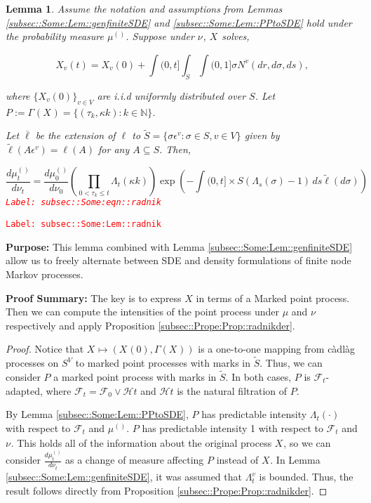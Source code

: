 \documentclass[12pt]{article}
\newcommand{\mb}{\mathbb}
\newcommand{\mc}{\mathcal}
\newcommand{\ov}{\overline}
\newcommand{\ep}{\epsilon}
\newcommand{\tr}{\textcolor{red}}
\newcommand{\labe}[1]{\tr{\texttt{Label: #1}}}
\newcommand{\purpose}{\textbf{Purpose: }}
\newcommand{\pfsum}{\textbf{Proof Summary: }}
\newcommand{\ind}{\hspace{24pt}}
\newcommand{\defeq}{:=}								%
\renewcommand{\v}{v}							%
\renewcommand{\S}{S}							%
\newcommand{\s}{\sigma}							%
\newcommand{\ev}{\ep}							%
\renewcommand{\t}{t}							%
\renewcommand{\tt}{s}							%
\newcommand{\F}{\mc{F}}							%
\newcommand{\FH}{\mc{H}}						%
\newcommand{\X}{X}								%
\newcommand{\vind}[1]{^{#1}}					%
\newcommand{\carp}[1]{^{#1}}					%
\newcommand{\vsi}[1]{^{#1}}						%
\newcommand{\cind}[1]{_{#1}}					%
\newcommand{\tp}[1]{(#1)}						%
\newcommand{\tip}[1]{#1}						%
\newcommand{\ts}[1]{_{#1}}						%
\newcommand{\sln}[1]{^{(#1)}}					%
\newcommand{\poiss}{N}							%
\newcommand{\Sm}{\ell}							%
\renewcommand{\r}{r}							%
\newcommand{\alt}[1]{\widetilde{#1}}			%
\newcommand{\indx}[1]{_{#1}}					%
\newcommand{\m}{\mu}							%
\newcommand{\mm}{\nu}							%
\newcommand{\rt}{\tau}							%
\renewcommand{\it}{k}							%
\newcommand{\pmap}{\Gamma}						%
\renewcommand{\mark}{\kappa}					%
\newcommand{\rp}{P}								%
\newcommand{\typset}{A}							%
\newcommand{\ratee}{\Lambda}					%
\newtheorem{lem}[thms]{Lemma}
\begin{document}
\begin{lem}
Assume the notation and assumptions from Lemmas \ref{subsec::Some:Lem::genfiniteSDE} and \ref{subsec::Some:Lem::PPtoSDE} hold under the probability measure \(\m\sln{}\ts{}\). Suppose under \(\mm\vind{}\ts{}\), \(\X\cind{}\tip{}\) solves,

\[\X\cind{\v}\tp{\t} = \X\cind{\v}\tp{0} +\int{(0,\t]}\int_\S\int{(0,1]} \s \poiss\vind{\v}(d\r,d\s,d\tt),\]

where \(\{\X\cind{\v}\tp{0}\}_{\v \in V}\) are i.i.d uniformly distributed over \(\S\). Let \(\rp{} \defeq \pmap\vind{}(\X\cind{}\tip{}) = \{(\rt\indx{\it},\mark{\it}):\it\in \mb{N}\}\).

\ind Let \(\ov{\ell}\) be the extension of \(\Sm\) to \(\alt{\S} = \{\s\ev\vind{\v}: \s \in \S, \v \in V\}\) given by \(\alt{\Sm}(\typset\ev\vind{\v}) = \Sm(\typset)\) for any \(\typset \subseteq \S\). Then,

\begin{equation}
\frac{d\m\sln{}\ts{\t}}{d\mm\vind{}\ts{\t}}= \frac{d\m\sln{}\ts{0}}{d\mm\vind{}\ts{0}}\left(\prod_{0< \rt\indx{\it}\leq \t} \ratee\ts{\t}(\mark{\it})\right)\exp\left(-\int{(0,\t]\times \S} (\ratee\ts{\tt}(\s) - 1)\,d\tt\alt{\Sm}(d\s)\right)
\label{subsec::Some:eqn::radnik}
\end{equation}
\labe{subsec::Some:eqn::radnik}
\label{subsec::Some:Lem::radnik}
\end{lem}
\labe{subsec::Some:Lem::radnik}

\purpose This lemma combined with Lemma \ref{subsec::Some:Lem::genfiniteSDE} allow us to freely alternate between SDE and density formulations of finite node Markov processes.

\pfsum The key is to express \(\X\) in terms of a Marked point process. Then we can compute the intensities of the point process under \(\m\) and \(\mm\) respectively and apply Proposition \ref{subsec::Prope:Prop::radnikder}.

\begin{proof}
Notice that \(\X\cind{}\tip{} \mapsto (\X\cind{}\tp{0},\pmap(\X\cind{}\tip{}))\) is a one-to-one mapping from c\`adl\`ag processes on \(\S\carp{V}\) to marked point processes with marks in \(\alt{\S}\). Thus, we can consider \(\rp{}\) a marked point process with marks in \(\alt{\S}\). In both cases, \(\rp{}\) is \(\F\vsi{}\ts{\t}\)-adapted, where \(\F\vsi{}\ts{\t} = \F\vsi{}\ts{0}\vee \FH{}{\t}\) and \(\FH{}{\t}\) is the natural filtration of \(\rp{}\).

\ind By Lemma \ref{subsec::Some:Lem::PPtoSDE}, \(\rp{}\) has predictable intensity \(\ratee\ts{\t}(\cdot)\) with respect to \(\F\vsi{}\ts{\t}\) and \(\m\sln{}\ts{}\). \(\rp{}\) has predictable intensity 1 with respect to \(\F\vsi{}\ts{\t}\) and \(\mm\vind{}\ts{}\). This holds all of the information about the original process \(\X\cind{}\tip{}\), so we can consider \(\frac{d\m\sln{}\ts{\t}}{d\mm\vind{}\ts{\t}}\) as a change of measure affecting \(\rp{}\) instead of \(\X\cind{}\tip{}\). In Lemma \ref{subsec::Some:Lem::genfiniteSDE}, it was assumed that \(\ratee\ts{\t}\vind{\v}\) is bounded. Thus, the result follows directly from Proposition \ref{subsec::Prope:Prop::radnikder}. 
\end{proof}
\end{document}
